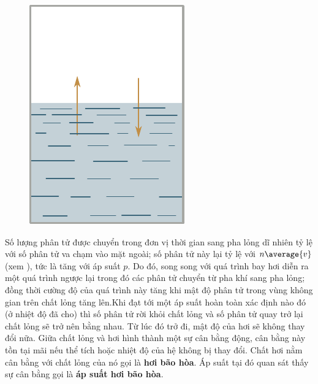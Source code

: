 \begin{figure}[!h]
	\begin{center}
		\includegraphics[scale=0.9]{figures/ch_15/fig_15_1.pdf}
		\caption[]{}
		\label{fig:15_1}
	\end{center}
	\vspace{-0.8cm}
\end{figure}
Số lượng phân tử được chuyển trong đơn vị thời gian sang pha lỏng dĩ nhiên tỷ lệ với số phân tử va chạm vào mặt ngoài; số phân tử này lại tỷ lệ với $n\average{v}$ (xem ), tức là tăng với áp suất $p$. Do đó, song song với quá trình bay hơi diễn ra một quá trình ngược lại trong đó các phân tử chuyển từ pha khí sang pha lỏng; đồng thời cường độ của quá trình này tăng khi mật độ phân tử trong vùng không gian trên chất lỏng tăng lên.Khi đạt tới một áp suất hoàn toàn xác định nào đó (ở nhiệt độ đã cho) thì số phân tử rời khỏi chất lỏng và số phân tử quay trở lại chất lỏng sẽ trở nên bằng nhau. Từ lúc đó trở đi, mật độ của hơi sẽ không thay đổi nữa. Giữa chất lỏng và hơi hình thành một sự cân bằng động, cân bằng này tồn tại mãi nếu thể tích hoặc nhiệt độ của hệ không bị thay đổi. Chất hơi nằm cân bằng với chất lỏng của nó gọi là \textbf{hơi bão hòa}. Áp suất tại đó quan sát thấy sự cân bằng gọi là \textbf{áp suất hơi bão hòa}.\\



